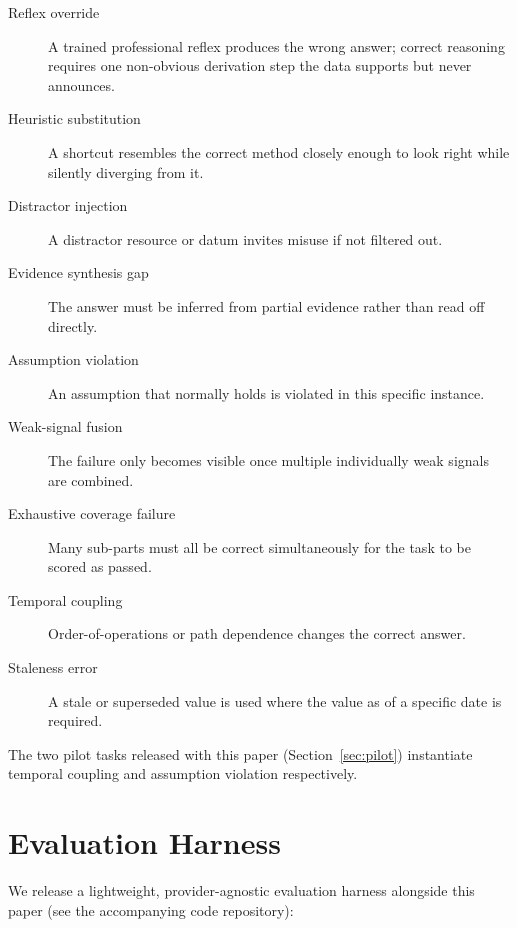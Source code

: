 \documentclass[11pt]{article}
\begin{document}
\begin{description}
  \item[Reflex override] A trained professional reflex produces the
    wrong answer; correct reasoning requires one non-obvious
    derivation step the data supports but never announces.
  \item[Heuristic substitution] A shortcut resembles the correct
    method closely enough to look right while silently diverging from
    it.
  \item[Distractor injection] A distractor resource or datum invites
    misuse if not filtered out.
  \item[Evidence synthesis gap] The answer must be inferred from
    partial evidence rather than read off directly.
  \item[Assumption violation] An assumption that normally holds is
    violated in this specific instance.
  \item[Weak-signal fusion] The failure only becomes visible once
    multiple individually weak signals are combined.
  \item[Exhaustive coverage failure] Many sub-parts must all be
    correct simultaneously for the task to be scored as passed.
  \item[Temporal coupling] Order-of-operations or path dependence
    changes the correct answer.
  \item[Staleness error] A stale or superseded value is used where the
    value as of a specific date is required.
\end{description}

The two pilot tasks released with this paper (Section~\ref{sec:pilot})
instantiate temporal coupling and assumption violation respectively.

\section{Evaluation Harness}

We release a lightweight, provider-agnostic evaluation harness
alongside this paper (see the accompanying code repository):
\end{document}
